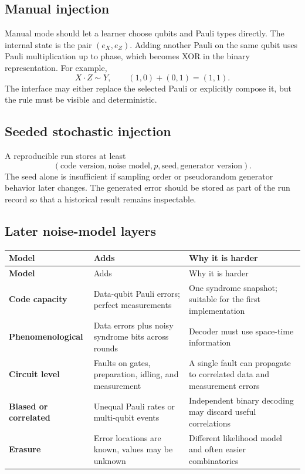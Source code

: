 \documentclass[11pt,letterpaper]{article}
\begin{document}
\subsection{Manual injection}

Manual mode should let a learner choose qubits and Pauli types directly. The internal state is the
pair $(e_X,e_Z)$. Adding another Pauli on the same qubit uses Pauli multiplication up to phase,
which becomes XOR in the binary representation. For example,
\begin{equation}
  X\cdot Z\sim Y,\qquad (1,0)+(0,1)=(1,1).
\end{equation}
The interface may either replace the selected Pauli or explicitly compose it, but the rule must be
visible and deterministic.

\subsection{Seeded stochastic injection}

A reproducible run stores at least
\begin{equation}
  (\text{code version},\text{noise model},p,\text{seed},\text{generator version}).
\end{equation}
The seed alone is insufficient if sampling order or pseudorandom generator behavior later changes.
The generated error should be stored as part of the run record so that a historical result remains
inspectable.

\subsection{Later noise-model layers}

\begin{longtable}{>{\bfseries}p{} p{} p{}}
\toprule
Model & Adds & Why it is harder \\
\midrule
\endfirsthead
\toprule
Model & Adds & Why it is harder \\
\midrule
\endhead
Code capacity & Data-qubit Pauli errors; perfect measurements & One syndrome snapshot; suitable for the first implementation \\
Phenomenological & Data errors plus noisy syndrome bits across rounds & Decoder must use space-time information \\
Circuit level & Faults on gates, preparation, idling, and measurement & A single fault can propagate to correlated data and measurement errors \\
Biased or correlated & Unequal Pauli rates or multi-qubit events & Independent binary decoding may discard useful correlations \\
Erasure & Error locations are known, values may be unknown & Different likelihood model and often easier combinatorics \\
\bottomrule
\end{longtable}
\end{document}
